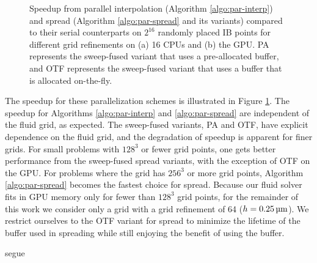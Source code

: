 \begin{figure}[h]
\caption{%
    Speedup from parallel interpolation (Algorithm \ref{algo:par-interp})
    and spread (Algorithm \ref{algo:par-spread} and its variants) compared
    to their serial counterparts on $2^{16}$ randomly placed IB points for
    different grid refinements on (a) 16 CPUs and (b) the GPU. PA represents
    the sweep-fused variant that uses a pre-allocated buffer, and OTF
    represents the sweep-fused variant that uses a buffer that is allocated
    on-the-fly.
}
\label{fig:grid-dependence}
\end{figure}

The speedup for these parallelization schemes is illustrated in Figure
\ref{fig:grid-dependence}. The speedup for Algorithms \ref{algo:par-interp} and
\ref{algo:par-spread} are independent of the fluid grid, as expected. The
sweep-fused variants, PA and OTF, have explicit dependence on the fluid grid,
and the degradation of speedup is apparent for finer grids. For small problems
with $128^3$ or fewer grid points, one gets better performance from the
sweep-fused spread variants, with the exception of OTF on the GPU. For problems
where the grid has $256^3$ or more grid points, Algorithm \ref{algo:par-spread}
becomes the fastest choice for spread. Because our fluid solver fits in GPU
memory only for fewer than $128^3$ grid points, for the remainder of this work
we consider only a grid with a grid refinement of 64 ($h = 0.25\um$). We
restrict ourselves to the OTF variant for spread to minimize the lifetime of
the buffer used in spreading while still enjoying the benefit of using the
buffer.

{\color{red} segue}
